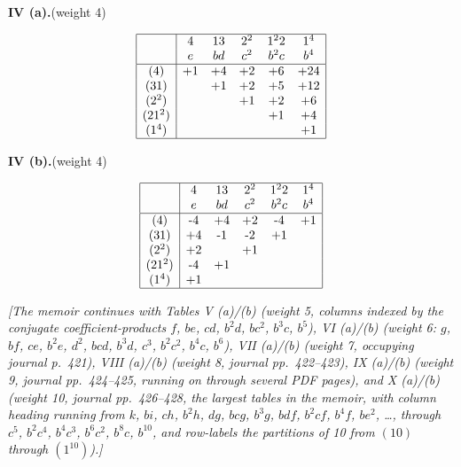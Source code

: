 \documentclass[11pt]{article}
\begin{document}
\bigskip

\begin{center}\textbf{IV (a).}\quad (weight 4)\end{center}
\[
\begin{array}{|c|ccccc|}
\hline
        & 4    & 13   & 2^2  & 1^2 2 & 1^4 \\
        & e    & bd   & c^2  & b^2 c & b^4 \\ \hline
(4)     & $+1$ & $+4$ & $+2$ & $+6$  & $+24$ \\
(31)    &      & $+1$ & $+2$ & $+5$  & $+12$ \\
(2^2)   &      &      & $+1$ & $+2$  & $+6$  \\
(21^2)  &      &      &      & $+1$  & $+4$  \\
(1^4)   &      &      &      &       & $+1$  \\ \hline
\end{array}
\]

\medskip

\begin{center}\textbf{IV (b).}\quad (weight 4)\end{center}
\[
\begin{array}{|c|ccccc|}
\hline
        & 4    & 13   & 2^2  & 1^2 2 & 1^4 \\
        & e    & bd   & c^2  & b^2 c & b^4 \\ \hline
(4)     & $-4$ & $+4$ & $+2$ & $-4$  & $+1$ \\
(31)    & $+4$ & $-1$ & $-2$ & $+1$  &      \\
(2^2)   & $+2$ &      & $+1$ &       &      \\
(21^2)  & $-4$ & $+1$ &      &       &      \\
(1^4)   & $+1$ &      &      &       &      \\ \hline
\end{array}
\]

\bigskip

\noindent\textit{[The memoir continues with Tables V (a)/(b) (weight 5, columns indexed by the conjugate coefficient-products $f$, $be$, $cd$, $b^2 d$, $bc^2$, $b^3 c$, $b^5$), VI (a)/(b) (weight 6: $g$, $bf$, $ce$, $b^2 e$, $d^2$, $bcd$, $b^3 d$, $c^3$, $b^2 c^2$, $b^4 c$, $b^6$), VII (a)/(b) (weight 7, occupying journal p.~421), VIII (a)/(b) (weight 8, journal pp.~422--423), IX (a)/(b) (weight 9, journal pp.~424--425, running on through several PDF pages), and X (a)/(b) (weight 10, journal pp.~426--428, the largest tables in the memoir, with column heading running from $k$, $bi$, $ch$, $b^2 h$, $dg$, $bcg$, $b^3 g$, $bdf$, $b^2 cf$, $b^4 f$, $be^2$, \ldots, through $c^5$, $b^2 c^4$, $b^4 c^3$, $b^6 c^2$, $b^8 c$, $b^{10}$, and row-labels the partitions of 10 from $(10)$ through $(1^{10})$).]}
\end{document}
